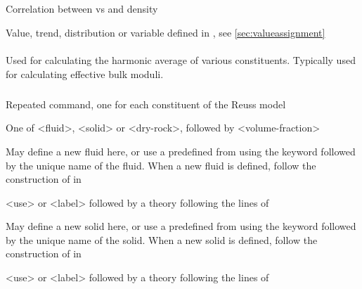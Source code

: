 {\subparagraph{}
 \slist
   \item \Description Correlation between vs and density
   \item \Argument Value, trend, distribution or variable defined in , see \autoref{sec:valueassignment}
   \item {}
 \elist

\paragraph{}
 \slist
   \item \Description Used for calculating the harmonic average of various constituents. Typically used for calculating effective bulk moduli.
   \item \Argument
   \item \Default
 \elist

\subparagraph{}
 \slist
   \item \Description Repeated command, one for each constituent of the Reuss model
   \item \Argument One of <fluid>, <solid> or <dry-rock>, followed by <volume-fraction>
   \item \Default
 \elist

 \slist
   \item \Description May define a new fluid here, or use a predefined  from  using the keyword  followed by the unique name of the fluid. When a new fluid is defined, follow the construction of  in 
   \item \Argument <use> or <label> followed by a theory following the lines of 
   \item \Default
 \elist

 \slist
   \item \Description May define a new solid here, or use a predefined  from  using the keyword  followed by the unique name of the solid. When a new solid is defined, follow the construction of  in 
   \item \Argument <use> or <label> followed by a theory following the lines of 
   \item \Default
 \elist

}
